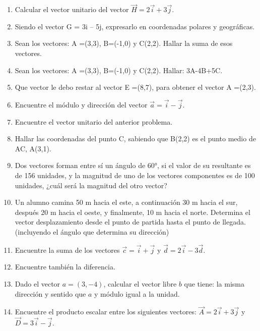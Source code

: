 \documentclass[a5paper,pagesize,10pt,bibtotoc,pointlessnumbers,
normalheadings,DIV=9,fleqn,x11names,table,twoside=false]{scrbook}
\begin{document}
\begin{enumerate}
 
 \item Calcular el vector unitario del vector $\vec{H} = 2\vec{i}+3\vec{j}$.
 
 \item Siendo el vector G = 3i – 5j, expresarlo en coordenadas polares y geográficas.
 
 \item Sean los vectores: A =(3,3), B=(-1,0) y C(2,2). Hallar la suma de esos vectores.
 
\item Sean los vectores: A =(3,3), B=(-1,0) y C(2,2). Hallar: 3A-4B+5C.

\item Que vector le debo restar al vector E =(8,7), para obtener el vector A =(2,3).
 
 \item Encuentre el módulo y dirección del vector $\vec{a}= \vec{i} - \vec{j}$.
 
 \item Encuentre el vector unitario del anterior problema.
 
 \item Hallar las coordenadas del punto C, sabiendo que B(2,2) es el punto medio de AC, A(3,1).
 
 \item Dos vectores forman entre sí un ángulo de 60°, si el valor de su resultante es de 156 unidades, y la magnitud de uno 
de los vectores componentes es de 100 unidades, ¿cuál será la magnitud del otro vector?
 
 \item Un alumno camina 50 m hacia el este, a continuación 30 m hacia el sur, después 20 m hacia el oeste, y finalmente, 10 m 
hacia el norte. Determina el vector desplazamiento desde el punto de partida hasta el punto de llegada. (incluyendo el ángulo que 
determina su dirección)
 
 \item Encuentre la suma de los vectores $\vec{c}=\vec{i}+\vec{j}$ y $\vec{d}=2\vec{i}-3\vec{d}$.
 
 \item Encuentre también la diferencia.
 
 \item Dado el vector $a =(3,-4)$, calcular el vector libre $b$ que tiene: la misma dirección y sentido que $a$ y módulo 
igual a la unidad.

\item Encuentre el producto escalar entre los siguientes vectores: $\vec{A} = 2\vec{i} + 3\vec{j}$ y $\vec{D} = 3\vec{i} - 
\vec{j}$.
 

\end{enumerate}
\end{document}

